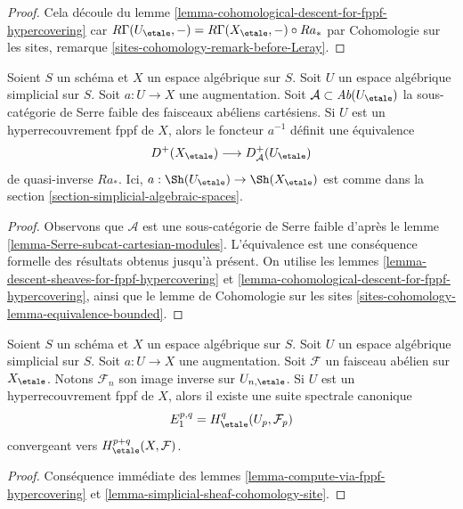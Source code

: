 \begin{proof}
Cela découle du lemme
\ref{lemma-cohomological-descent-for-fppf-hypercovering}
car $R\Gamma(U_\etale, -) = R\Gamma(X_\etale, -) \circ Ra_*$ par
Cohomologie sur les sites, remarque \ref{sites-cohomology-remark-before-Leray}.
\end{proof}

\begin{lemma}
\label{lemma-fppf-hypercovering-equivalence-bounded}
Soient $S$ un schéma et $X$ un espace algébrique sur $S$.
Soit $U$ un espace algébrique simplicial sur $S$. Soit $a : U \to X$
une augmentation.
Soit $\mathcal{A} \subset \textit{Ab}(U_\etale)$
la sous-catégorie de Serre faible des faisceaux abéliens cartésiens.
Si $U$ est un hyperrecouvrement fppf de $X$, alors
le foncteur $a^{-1}$ définit une équivalence
$$
D^+(X_\etale) \longrightarrow D_\mathcal{A}^+(U_\etale)
$$
de quasi-inverse $Ra_*$. Ici, $a : \Sh(U_\etale) \to \Sh(X_\etale)$
est comme dans la section \ref{section-simplicial-algebraic-spaces}.
\end{lemma}

\begin{proof}
Observons que $\mathcal{A}$ est une sous-catégorie de Serre faible d'après le
lemme \ref{lemma-Serre-subcat-cartesian-modules}.
L'équivalence est une conséquence formelle
des résultats obtenus jusqu'à présent. On utilise les lemmes
\ref{lemma-descent-sheaves-for-fppf-hypercovering} et
\ref{lemma-cohomological-descent-for-fppf-hypercovering}, ainsi que le lemme de Cohomologie
sur les sites \ref{sites-cohomology-lemma-equivalence-bounded}.
\end{proof}

\begin{lemma}
\label{lemma-spectral-sequence-fppf-hypercovering}
Soient $S$ un schéma et $X$ un espace algébrique sur $S$.
Soit $U$ un espace algébrique simplicial sur $S$. Soit $a : U \to X$
une augmentation. Soit $\mathcal{F}$ un faisceau abélien
sur $X_\etale$. Notons $\mathcal{F}_n$ son image inverse sur $U_{n, \etale}$.
Si $U$ est un hyperrecouvrement fppf de $X$, alors
il existe une suite spectrale canonique
$$
E_1^{p, q} = H^q_\etale(U_p, \mathcal{F}_p)
$$
convergeant vers $H^{p + q}_\etale(X, \mathcal{F})$.
\end{lemma}

\begin{proof}
Conséquence immédiate des lemmes \ref{lemma-compute-via-fppf-hypercovering}
et \ref{lemma-simplicial-sheaf-cohomology-site}.
\end{proof}








